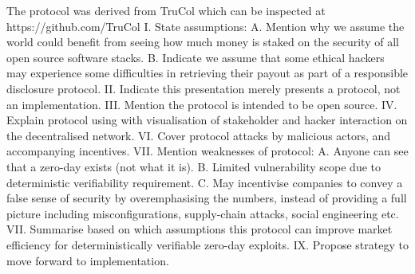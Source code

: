 \documentclass{article}
\begin{document}

The protocol was derived from TruCol which can be inspected at https://github.com/TruCol
%
I. State assumptions: 
A. Mention why we assume the world could benefit from seeing how much money is staked on the security of all open source software stacks. 
B. Indicate we assume that some ethical hackers may experience some difficulties in retrieving their payout as part of a responsible disclosure protocol.
II. Indicate this presentation merely presents a protocol, not an implementation.
III. Mention the protocol is intended to be open source.
IV. Explain protocol using with visualisation of stakeholder and hacker interaction on the decentralised network.
VI. Cover protocol attacks by malicious actors, and accompanying incentives.
VII. Mention weaknesses of protocol: 
A. Anyone can see that a zero-day exists (not what it is). 
B. Limited vulnerability scope due to deterministic verifiability requirement. 
C. May incentivise companies to convey a false sense of security by overemphasising the numbers, instead of providing a full picture including misconfigurations, supply-chain attacks, social engineering etc.
VII. Summarise based on which assumptions this protocol can improve market efficiency for deterministically verifiable zero-day exploits. 
IX. Propose strategy to move forward to implementation.
\end{document}
